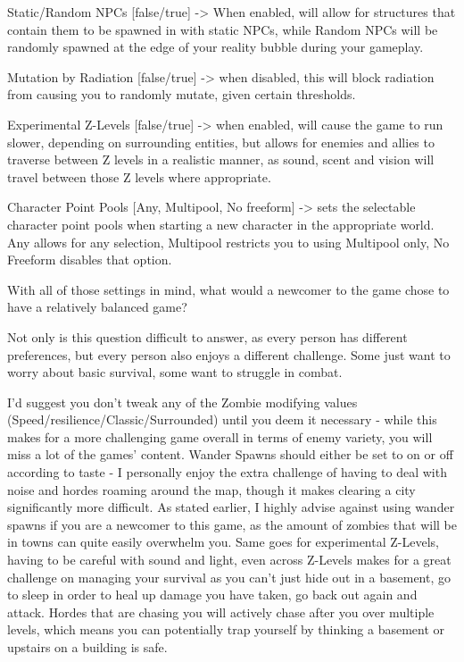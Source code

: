 \documentclass[11pt]{report}
\begin{document}
Static/Random NPCs [false/true] -> When enabled, will allow for structures that contain them to be spawned in with static NPCs, while Random NPCs will be randomly spawned at the edge of your reality bubble during your gameplay.

Mutation by Radiation [false/true] -> when disabled, this will block radiation from causing you to randomly mutate, given certain thresholds.

Experimental Z-Levels [false/true] -> when enabled, will cause the game to run slower, depending on surrounding entities, but allows for enemies and allies to traverse between Z levels in a realistic manner, as sound, scent and vision will travel between those Z levels where appropriate.

Character Point Pools [Any, Multipool, No freeform] -> sets the selectable character point pools when starting a new character in the appropriate world. Any allows for any selection, Multipool restricts you to using Multipool only, No Freeform disables that option.

With all of those settings in mind, what would a newcomer to the game chose to have a relatively balanced game?

Not only is this question difficult to answer, as every person has different preferences, but every person also enjoys a different challenge. Some just want to worry about basic survival, some want to struggle in combat.

I'd suggest you don't tweak any of the Zombie modifying values (Speed/resilience/Classic/Surrounded) until you deem it necessary - while this makes for a more challenging game overall in terms of enemy variety, you will miss a lot of the games' content. Wander Spawns should either be set to on or off according to taste - I personally enjoy the extra challenge of having to deal with noise and hordes roaming around the map, though it makes clearing a city significantly more difficult. As stated earlier, I highly advise against using wander spawns if you are a newcomer to this game, as the amount of zombies that will be in towns can quite easily overwhelm you. Same goes for experimental Z-Levels, having to be careful with sound and light, even across Z-Levels makes for a great challenge on managing your survival as you can't just hide out in a basement, go to sleep in order to heal up damage you have taken, go back out again and attack. Hordes that are chasing you will actively chase after you over multiple levels, which means you can potentially trap yourself by thinking a basement or upstairs on a building is safe.
\end{document}
